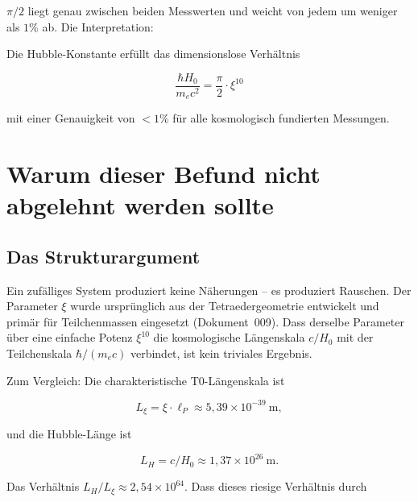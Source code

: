 $\pi/2$ liegt genau zwischen beiden Messwerten und weicht von jedem um weniger
als $1\%$ ab. Die Interpretation:

\begin{keyresult}
    Die Hubble-Konstante erfüllt das dimensionslose Verhältnis

    \begin{equation}
        \frac{\hbar H_0}{m_e c^2} = \frac{\pi}{2} \cdot \xi^{10}
        \label{eq:ratio_central}
    \end{equation}

    mit einer Genauigkeit von $<1\%$ für alle kosmologisch fundierten
    Messungen.
\end{keyresult}

\section{Warum dieser Befund nicht abgelehnt werden sollte}
\label{sec:argument}

\subsection{Das Strukturargument}

Ein zufälliges System produziert keine Näherungen -- es produziert Rauschen.
Der Parameter $\xi$ wurde ursprünglich aus der Tetraedergeometrie entwickelt
und primär für Teilchenmassen eingesetzt (Dokument~009). Dass derselbe
Parameter über eine einfache Potenz $\xi^{10}$ die kosmologische
Längenskala $c/H_0$ mit der Teilchenskala $\hbar/(m_e c)$ verbindet,
ist kein triviales Ergebnis.

Zum Vergleich: Die charakteristische T0-Längenskala ist

\begin{equation}
    L_\xi = \xi \cdot \ell_P \approx 5{,}39 \times 10^{-39}\ \text{m},
\end{equation}

und die Hubble-Länge ist

\begin{equation}
    L_H = c / H_0 \approx 1{,}37 \times 10^{26}\ \text{m}.
\end{equation}

Das Verhältnis $L_H / L_\xi \approx 2{,}54 \times 10^{64}$. Dass dieses
riesige Verhältnis durch

